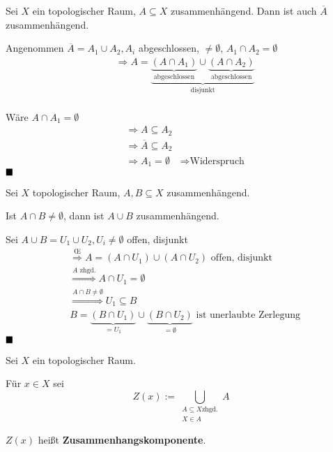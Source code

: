 \begin{korollar}\label{zusammenhangAbschluss}
    Sei $X$ ein topologischer Raum, $A \subseteq X$ zusammenhängend.
    Dann ist auch $\overline{A}$ zusammenhängend.
\end{korollar}

\begin{beweis}
    Angenommen $\overline{A} = A_1 \cup A_2, A_i$ abgeschlossen, $\neq \emptyset$,
    $A_1 \cap A_2 = \emptyset$
    \begin{align*}
        &\Rightarrow A = \underbrace{\underbrace{(A \cap A_1)}_\text{abgeschlossen} \cup \underbrace{(A \cap A_2)}_\text{abgeschlossen}}_\text{disjunkt}\\
    \end{align*}

    Wäre $A \cap A_1 = \emptyset$
    \begin{align*}
        &\Rightarrow A \subseteq A_2\\
        &\Rightarrow \overline{A} \subseteq A_2\\
        &\Rightarrow A_1 = \emptyset
        &\Rightarrow \text{Widerspruch}
    \end{align*}
    $\qed$
\end{beweis}

\begin{korollar}\label{zusammenhangVereinigung}
    Sei $X$ topologischer Raum, $A, B \subseteq X$ zusammenhängend.

    Ist $A \cap B \neq \emptyset$, dann ist $A \cup B$ zusammenhängend.
\end{korollar}

\begin{beweis}
    Sei $A \cup B = U_1 \cup U_2, U_i \neq \emptyset$ offen, disjunkt
    \begin{align*}
        &\stackrel{\text{\OE}}{\Rightarrow} A = (A \cap U_1) \cup (A \cap U_2) \text{ offen, disjunkt}\\
        &\stackrel{A \text{ zhgd.}}{\Rightarrow} A \cap U_1 = \emptyset\\
        &\stackrel{A \cap B \neq \emptyset}{\Rightarrow} U_1 \subseteq B\\
        &B = \underbrace{(B \cap U_1)}_{= U_1} \cup \underbrace{(B \cap U_2)}_{= \emptyset} \text{ ist unerlaubte Zerlegung}
    \end{align*}
    $\qed$
\end{beweis}

\begin{definition}
    Sei $X$ ein topologischer Raum.
    
    Für $x \in X$ sei 
    \[Z(x) := \bigcup_{\substack{A \subseteq X \text{zhgd.}\\ X \in A}} A\]

     $Z(x)$ heißt \textbf{Zusammenhangskomponente}.
\end{definition}

